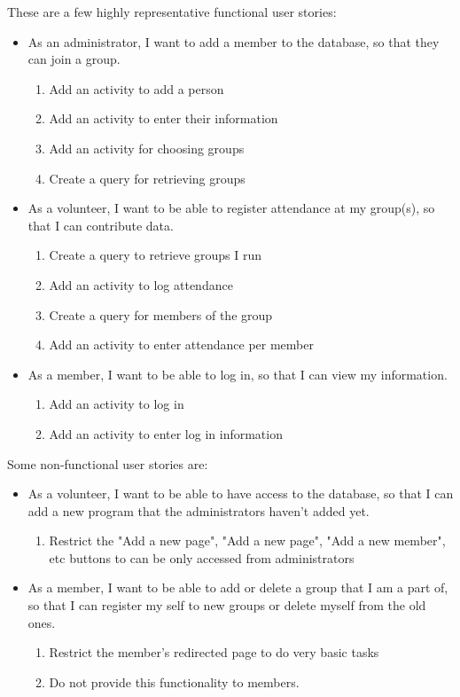 \documentclass{l3proj}
\begin{document}
These are a few highly representative functional user stories:
\begin{itemize}
\item As an administrator, I want to add a member to the database, so that they can join a group.

	\begin{enumerate}
	\item Add an activity to add a person
	\item Add an activity to enter their information
	\item Add an activity for choosing groups
	\item Create a query for retrieving groups
	\end{enumerate}

\item As a volunteer, I want to be able to register attendance at my group(s), so that I can contribute data.

	\begin{enumerate}
	\item Create a query to retrieve groups I run
	\item Add an activity to log attendance
	\item Create a query for members of the group
	\item Add an activity to enter attendance per member
	\end{enumerate}

\item As a member, I want to be able to log in, so that I can view my information.

	\begin{enumerate}
	\item Add an activity to log in
	\item Add an activity to enter log in information
	\end{enumerate}
\end{itemize}

Some non-functional user stories are:

\begin{itemize}
\item As a volunteer, I want to be able to have access to the database, so that I can add a new program that the administrators haven't added yet.

	\begin{enumerate}
	\item Restrict the "Add a new page", "Add a new page", "Add a new member", etc buttons to can be only accessed from administrators
	\end{enumerate}

\item As a member, I want to be able to add or delete a group that I am a part of, so that I can register my self to new groups or delete myself from the old ones.

	\begin{enumerate}
	\item Restrict the member's redirected page to do very basic tasks
	\item Do not provide this functionality to members.
	\end{enumerate}
\end{itemize}
\end{document}
